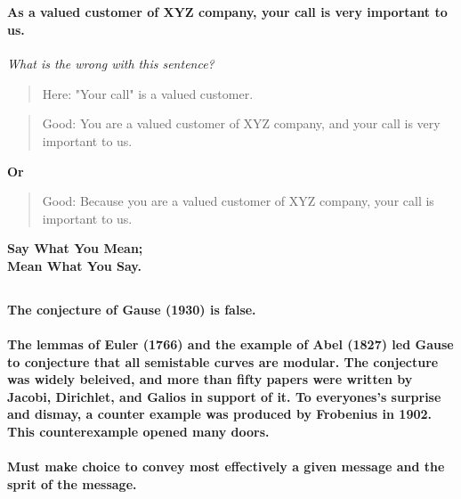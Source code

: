 \documentclass[]{report}
\begin{document}
  \subsection{}
  \paragraph{As a valued customer of XYZ company, your call is very
important to us.}
\begin{center}
\emph{{\large What is the wrong with this sentence?}}
\end{center}
\begin{verse}
{\large Here:} "Your call" is a valued  customer.
\end{verse}
\begin{verse}
{\large Good:} You are a valued customer of XYZ company, and your call is
very important to us.
\end{verse}
\begin{center}
\textbf{Or}
\end{center}
\begin{verse}
{\large Good:} Because you are a valued customer of XYZ company, your call
is important to us.
\end{verse}
\begin{center}
\textbf {{\large Say What You Mean; \\
	    Mean What You Say.} }
\end{center}
\subsection{}
\paragraph{The conjecture of Gause (1930) is false.}
\paragraph{The lemmas of Euler (1766) and the example of Abel (1827)
led Gause to conjecture that all semistable curves are modular.
The conjecture was widely beleived, and more than fifty papers
were written by Jacobi, Dirichlet, and Galios in support of it. To
everyones’s surprise and dismay, a counter example was
produced by Frobenius in 1902. This counterexample opened
many doors.}
\paragraph{}
\begin{center}
\textbf{{\large Must make choice to convey most effectively a given message
and the sprit of the message.}}
\end{center}
\end{document}

